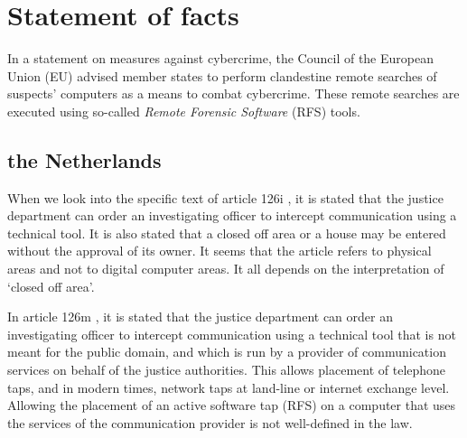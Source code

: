 \documentclass[11pt]{article} %
\begin{document}
\section{Statement of facts}
In a statement on measures against cybercrime, the Council of the European Union (EU) advised member states to perform clandestine remote searches of suspects' computers as a means to combat cybercrime.
These remote searches are executed using so-called \textit{Remote Forensic Software} (RFS) tools.

\subsection{the Netherlands}
When we look into the specific text of article 126i \cite{wb:sv126i}, it is stated that the justice department can order an investigating officer to intercept communication using a technical tool.
It is also stated that a closed off area or a house may be entered without the approval of its owner.
It seems that the article refers to physical areas and not to digital computer areas.
It all depends on the interpretation of `closed off area'.

In article 126m \cite{wb:sv126m}, it is stated that the justice department can order an investigating officer to intercept communication  using a technical tool that is not meant for the public domain, and which is run by a provider of communication services on behalf of the justice authorities.
This allows placement of telephone taps, and in modern times, network taps at land-line or internet exchange level.
Allowing the placement of an active software tap (RFS) on a computer that uses the services of the communication provider is not well-defined in the law.
\end{document}
